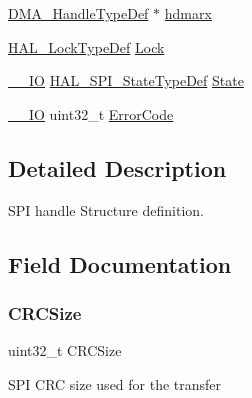 \begin{DoxyCompactItemize}
\hyperlink{group___d_m_a___exported___types_ga92b907d56a9c29b93d46782a7a04f91e}{D\+M\+A\+\_\+\+Handle\+Type\+Def} $\ast$ \hyperlink{struct_____s_p_i___handle_type_def_abd0aeec20298a55d89a440320e35634f}{hdmarx}
\item 
\hyperlink{stm32f0xx__hal__def_8h_ab367482e943333a1299294eadaad284b}{H\+A\+L\+\_\+\+Lock\+Type\+Def} \hyperlink{struct_____s_p_i___handle_type_def_ad4cf225029dbefe8d3fe660c33b8bb6b}{Lock}
\item 
\hyperlink{core__sc300_8h_aec43007d9998a0a0e01faede4133d6be}{\+\_\+\+\_\+\+IO} \hyperlink{group___s_p_i___exported___types_ga8891cb64e76198a860172d94c638c9b4}{H\+A\+L\+\_\+\+S\+P\+I\+\_\+\+State\+Type\+Def} \hyperlink{struct_____s_p_i___handle_type_def_ac77adb7330099a917af1e9021cbb3de1}{State}
\item 
\hyperlink{core__sc300_8h_aec43007d9998a0a0e01faede4133d6be}{\+\_\+\+\_\+\+IO} uint32\+\_\+t \hyperlink{struct_____s_p_i___handle_type_def_a123c5063e6a3b1901b2fbe5f88c53a7e}{Error\+Code}
\end{DoxyCompactItemize}


\subsection{Detailed Description}
S\+PI handle Structure definition. 

\subsection{Field Documentation}
\mbox{\label{struct_____s_p_i___handle_type_def_a752c564d700e8da6d94c705629d204aa}} 
\subsubsection{\texorpdfstring{C\+R\+C\+Size}{CRCSize}}
{\footnotesize\ttfamily uint32\+\_\+t C\+R\+C\+Size}

S\+PI C\+RC size used for the transfer \mbox{\label{struct_____s_p_i___handle_type_def_a123c5063e6a3b1901b2fbe5f88c53a7e}} 

